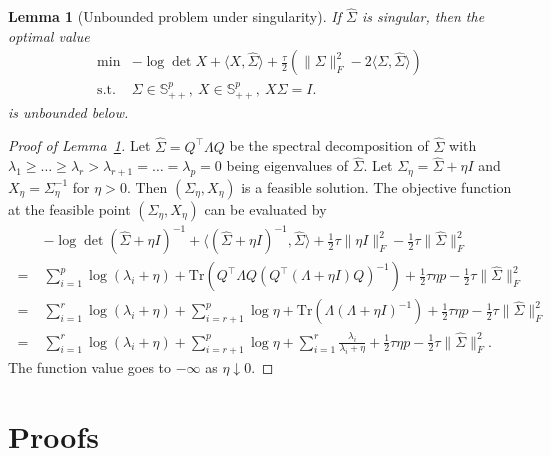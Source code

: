 \documentclass[11pt]{article}
\def\S{\mathbb{S}}
\def\la{\langle}
\def\ra{\rangle}
\newtheorem{lemma}{Lemma}
\def\transpose{\top}
\def\S{\mathbb{S}}
\def\tr{\mathrm{Tr}}
\def\la{\langle}
\def\PD{{\S^p_{++}}}
\def\ra{\rangle}
\newcommand{\wh}{\widehat}
\begin{document}
\begin{lemma}[Unbounded problem under singularity] \label{lemma:unbounded}
    If $\wh\Sigma$ is singular, then the optimal value
    \begin{equation*}
        \begin{array}{cl}
        \min &  -\log \det X + \la X,\wh\Sigma\ra + \frac{\tau}{2} \left(\|\Sigma\|_F^2-2\la\Sigma,\wh\Sigma\ra \right) \\
        \mathrm{s.t.} & \Sigma\in \PD,~X\in \PD,~X\Sigma=I.
        \end{array}
    \end{equation*}
    is unbounded below.
\end{lemma}
\begin{proof}[Proof of Lemma~\ref{lemma:unbounded}]
Let $\wh\Sigma = Q^\transpose \Lambda Q$ be the spectral decomposition of $\wh\Sigma$ with 
$\lambda_1\geq\ldots\geq\lambda_r>\lambda_{r+1}=\ldots=\lambda_p=0$ being eigenvalues of $\wh\Sigma$. Let $\Sigma_\eta = \wh\Sigma + \eta I$ 
and $X_\eta=\Sigma_\eta^{-1}$ for $\eta>0$.  Then $(\Sigma_\eta, X_\eta)$ is a feasible solution. The objective function at the feasible point $(\Sigma_\eta, X_\eta)$ can be evaluated by
\begin{align*}
    &-\log\det (\wh\Sigma + \eta I)^{-1} + \la (\wh\Sigma + \eta I)^{-1},\widehat{\Sigma}\ra +\frac{1}{2}\tau \|\eta I\|_F^2 - \frac{1}{2}\tau \|\wh\Sigma\|_F^2\\ \;=\; &\sum_{i=1}^p \log (\lambda_i+\eta) + \tr\left(Q^\transpose \Lambda Q (Q^\transpose(\Lambda+\eta I)Q)^{-1}\right) + \frac{1}{2}\tau \eta p - \frac{1}{2}\tau \|\wh\Sigma\|_F^2\\ \;=\; &\sum_{i=1}^r \log (\lambda_i+\eta) + \sum_{i=r+1}^p \log \eta + \tr\left(\Lambda(\Lambda+\eta I)^{-1}\right) + \frac{1}{2}\tau \eta p- \frac{1}{2}\tau \|\wh\Sigma\|_F^2\\\;=\; &\sum_{i=1}^r \log (\lambda_i+\eta) + \sum_{i=r+1}^p \log \eta + \sum_{i=1}^r \frac{\lambda_i}{\lambda_i+\eta}+ \frac{1}{2}\tau \eta p- \frac{1}{2}\tau \|\wh\Sigma\|_F^2.
\end{align*}
The function value goes to $-\infty$ as $\eta\downarrow 0$. 
\end{proof}

\section{Proofs}
\end{document}
